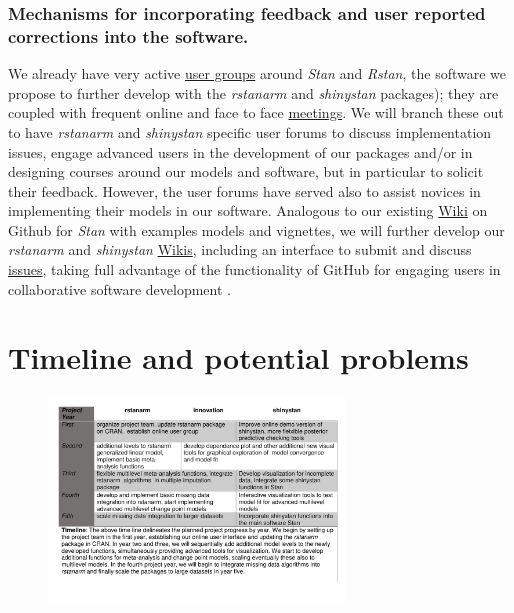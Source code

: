 \documentclass[11pt,notitlepage]{article}
\begin{document}
\subsubsection*{Mechanisms for incorporating feedback and user reported corrections into the software.}



We already have very active \href{https://groups.google.com/forum/#!forum/stan-users} {user groups} around \textit{Stan} and \textit{Rstan}, the software we propose to further develop with the \textit{rstanarm} and \textit{shinystan} packages); they are coupled with frequent online and face to face \href{http://www.meetup.com/bda-group/}{meetings}. We will branch these out to have \textit{rstanarm} and \textit{shinystan} specific user forums to discuss implementation issues, engage advanced users in the development of our packages and/or in designing courses around our models and software, but in particular to solicit their feedback. However, the user forums have served also to assist novices in implementing their models in our software.
Analogous to our existing \href{https://github.com/stan-dev/example-models/wiki}{Wiki} on Github for \textit{Stan} with examples models and vignettes, we will further develop our \textit{rstanarm} and \textit{shinystan} \href{https://github.com/stan-dev/rstanarm/wiki}{Wikis}, including an interface to submit and discuss \href{https://github.com/stan-dev/rstanarm/issues}{issues}, taking full advantage of the functionality of GitHub for engaging users in collaborative software development \cite{loeliger2012version}. 

\section*{Timeline and potential problems}

\begin{figure} %
    \centering
 \vspace{-30pts}
\includegraphics[width=0.7\textwidth]{Figures/Timeline.pdf}
 \vspace{-60pts}
\end{figure}
\end{document}
